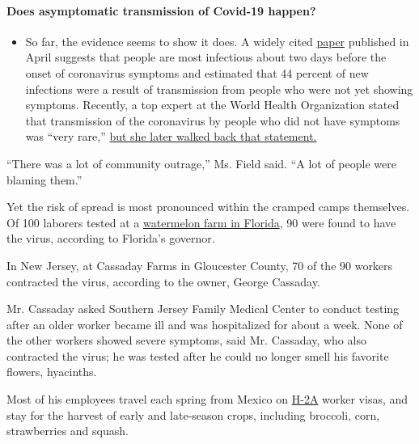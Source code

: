 \begin{itemize}
{  \paragraph{Does asymptomatic transmission of Covid-19
  happen?}\label{does-asymptomatic-transmission-of-covid-19-happen}}

  \begin{itemize}
  \tightlist
  \item
    So far, the evidence seems to show it does. A widely cited
    \href{https://www.nature.com/articles/s41591-020-0869-5}{paper}
    published in April suggests that people are most infectious about
    two days before the onset of coronavirus symptoms and estimated that
    44 percent of new infections were a result of transmission from
    people who were not yet showing symptoms. Recently, a top expert at
    the World Health Organization stated that transmission of the
    coronavirus by people who did not have symptoms was ``very rare,''
    \href{https://www.nytimes3xbfgragh.onion/2020/06/09/world/coronavirus-updates.html?action=click\&pgtype=Article\&state=default\&region=MAIN_CONTENT_3\&context=storylines_faq\#link-1f302e21}{but
    she later walked back that statement.}
  \end{itemize}
\end{itemize}

``There was a lot of community outrage,'' Ms. Field said. ``A lot of
people were blaming them.''

Yet the risk of spread is most pronounced within the cramped camps
themselves. Of 100 laborers tested at a
\href{https://www.nytimes3xbfgragh.onion/2020/06/18/us/florida-coronavirus-immokalee-farmworkers.html}{watermelon
farm in Florida}, 90 were found to have the virus, according to
Florida's governor.

In New Jersey, at Cassaday Farms in Gloucester County, 70 of the 90
workers contracted the virus, according to the owner, George Cassaday.

Mr. Cassaday asked Southern Jersey Family Medical Center to conduct
testing after an older worker became ill and was hospitalized for about
a week. None of the other workers showed severe symptoms, said Mr.
Cassaday, who also contracted the virus; he was tested after he could no
longer smell his favorite flowers, hyacinths.

Most of his employees travel each spring from Mexico on
\href{https://www.uscis.gov/working-united-states/temporary-workers/h-2a-temporary-agricultural-workers}{H-2A}
worker visas, and stay for the harvest of early and late-season crops,
including broccoli, corn, strawberries and squash.

